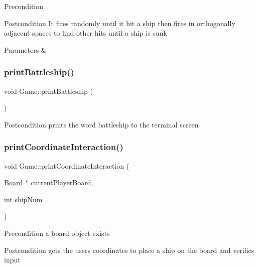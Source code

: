 \begin{DoxyPrecond}{Precondition}

\end{DoxyPrecond}
\begin{DoxyPostcond}{Postcondition}
It fires randomly until it hit a ship then fires in orthogonally adjacent spaces to find other hits until a ship is sunk 
\end{DoxyPostcond}

\begin{DoxyParams}{Parameters}
{\em } & \\
\hline
\end{DoxyParams}
\mbox{\label{classGame_a56decb134b379171d8c9d713cb761187}} 
\subsubsection{\texorpdfstring{print\+Battleship()}{printBattleship()}}
{\footnotesize\ttfamily void Game\+::print\+Battleship (\begin{DoxyParamCaption}{ }\end{DoxyParamCaption})}

\begin{DoxyPostcond}{Postcondition}
prints the word battleship to the terminal screen 
\end{DoxyPostcond}
\mbox{\label{classGame_abd0b9e69475d3769fd4564ef1a611daf}} 
\subsubsection{\texorpdfstring{print\+Coordinate\+Interaction()}{printCoordinateInteraction()}}
{\footnotesize\ttfamily void Game\+::print\+Coordinate\+Interaction (\begin{DoxyParamCaption}\item[{\hyperlink{classBoard}{Board} $\ast$}]{current\+Player\+Board,  }\item[{int}]{ship\+Num }\end{DoxyParamCaption})}

\begin{DoxyPrecond}{Precondition}
a board object exists 
\end{DoxyPrecond}
\begin{DoxyPostcond}{Postcondition}
gets the user\textquotesingle{}s coordinates to place a ship on the board and verifies input 
\end{DoxyPostcond}

